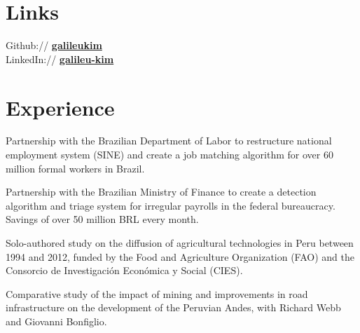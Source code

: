 \documentclass[]{deedy-resume-openfont}
\begin{document}
\begin{minipage}[t]{0.33\textwidth}
    \section{Links}
    Github:// \href{https://github.com/galileukim}{\bf galileukim} \\
    LinkedIn://  \href{https://www.linkedin.com/in/galileu-kim}{\bf galileu-kim} \\
    \sectionsep
    
    \hfill
    \end{minipage} 
\begin{minipage}[t]{0.66\textwidth} 


\section{Experience}
\vspace{\topsep} %
\begin{tightemize}
\item Partnership with the Brazilian Department of Labor to restructure national employment system (SINE) and create a job matching algorithm for over 60 million formal workers in Brazil.
\item Partnership with the Brazilian Ministry of Finance to create a detection algorithm and triage system for irregular payrolls in the federal bureaucracy. Savings of over 50 million BRL every month.
\end{tightemize}
\sectionsep

\begin{tightemize}
\item Solo-authored study on the diffusion of agricultural technologies in Peru between 1994 and 2012, funded by the Food and Agriculture Organization (FAO) and the Consorcio de Investigación Económica y Social (CIES).
\item Comparative study of the impact of mining and improvements in road infrastructure on the development of the Peruvian Andes, with Richard Webb and Giovanni Bonfiglio.
\end{tightemize}
\sectionsep


\end{minipage}
\end{document}
